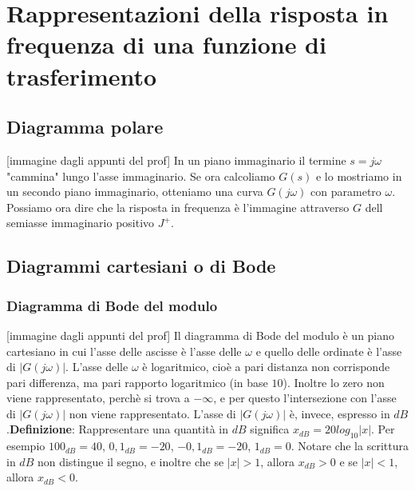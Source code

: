 \section{Rappresentazioni della risposta in frequenza di una funzione di trasferimento}
\subsection{Diagramma polare}
[immagine dagli appunti del prof]\newline
In un piano immaginario il termine $s = j \omega$ "cammina" lungo l'asse immaginario. Se ora calcoliamo $G(s)$ e lo mostriamo in un secondo piano immaginario, otteniamo una curva $
G(j \omega)$ con parametro $\omega$.\newline
\newline
Possiamo ora dire che la risposta in frequenza è l'immagine attraverso $G$ dell semiasse immaginario positivo $J^+$.
\subsection{Diagrammi cartesiani o di Bode}
\subsubsection{Diagramma di Bode del modulo}
[immagine dagli appunti del prof]\newline
\newline
Il diagramma di Bode del modulo è un piano cartesiano in cui l'asse delle ascisse è l'asse delle $\omega$ e quello delle ordinate è l'asse di $|G(j \omega)|$.\newline
\newline
L'asse delle $\omega$ è logaritmico, cioè a pari distanza non corrisponde pari differenza, ma pari rapporto logaritmico (in base $10$). Inoltre lo zero non viene rappresentato, perchè si trova a $- \infty$, e per questo l'intersezione con l'asse di $|G(j \omega)|$ non viene rappresentato.\newline
\newline
L'asse di $|G(j \omega)|$ è, invece, espresso in $dB$.\newline \textbf{Definizione}: Rappresentare una quantità in $dB$ significa $x_{dB} = 20 log_10|x|$.\newline
Per esempio $100_{dB} = 40$, $0,1 _{dB} = -20$, $-0,1 _{dB} = -20$, $1 _{dB} = 0$. Notare che la scrittura in $dB$ non distingue il segno, e inoltre che se $|x| > 1$, allora $x _{dB} >0$ e se $|x|<1$, allora $x _{dB} <0$.
